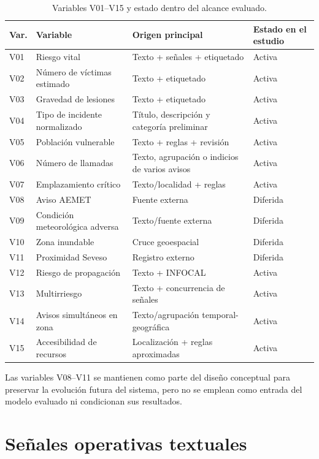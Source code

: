 \begin{table}[htbp]
\centering
\scriptsize
\begin{tabular}{|p{1.0cm}|p{4.0cm}|p{3.9cm}|p{4.0cm}|}
\hline
\textbf{Var.} & \textbf{Variable} & \textbf{Origen principal} & \textbf{Estado en el estudio} \\ \hline
V01 & Riesgo vital & Texto + señales + etiquetado & Activa \\ \hline
V02 & Número de víctimas estimado & Texto + etiquetado & Activa \\ \hline
V03 & Gravedad de lesiones & Texto + etiquetado & Activa \\ \hline
V04 & Tipo de incidente normalizado & Título, descripción y categoría preliminar & Activa \\ \hline
V05 & Población vulnerable & Texto + reglas + revisión & Activa \\ \hline
V06 & Número de llamadas & Texto, agrupación o indicios de varios avisos & Activa \\ \hline
V07 & Emplazamiento crítico & Texto/localidad + reglas & Activa \\ \hline
V08 & Aviso AEMET & Fuente externa & Diferida \\ \hline
V09 & Condición meteorológica adversa & Texto/fuente externa & Diferida \\ \hline
V10 & Zona inundable & Cruce geoespacial & Diferida \\ \hline
V11 & Proximidad Seveso & Registro externo & Diferida \\ \hline
V12 & Riesgo de propagación & Texto + INFOCAL & Activa \\ \hline
V13 & Multirriesgo & Texto + concurrencia de señales & Activa \\ \hline
V14 & Avisos simultáneos en zona & Texto/agrupación temporal-geográfica & Activa \\ \hline
V15 & Accesibilidad de recursos & Localización + reglas aproximadas & Activa \\ \hline
\end{tabular}
\caption{Variables V01--V15 y estado dentro del alcance evaluado.}
\label{tab:variables-cap7}
\end{table}

Las variables V08--V11 se mantienen como parte del diseño conceptual para preservar la evolución futura del sistema, pero no se emplean como entrada del modelo evaluado ni condicionan sus resultados.

\section{Señales operativas textuales}

